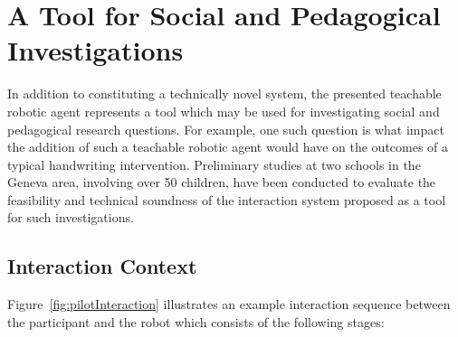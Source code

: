 \documentclass{sig-alternate}
\begin{document}


\section{A Tool for Social and Pedagogical Investigations} \label{sec:experiment}
\label{sec4}

In addition to constituting a technically novel system, the presented teachable
robotic agent represents a tool which may be used for investigating social and
pedagogical research questions. For example, one such question is what impact
the addition of such a teachable robotic agent would have on the outcomes of a
typical handwriting intervention.  Preliminary studies at two schools in the
Geneva area, involving over 50 children, have been conducted to evaluate the
feasibility and technical soundness of the interaction system proposed as a tool
for such investigations.

\subsection{Interaction Context}


Figure~\ref{fig:pilotInteraction} illustrates an example interaction sequence
between the participant and the robot which consists of the following stages:
\end{document}
